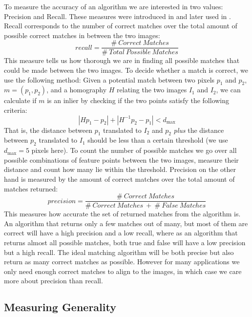 To measure the accuracy of an algorithm we are interested in two values:
Precision and Recall. These measures were introduced in \cite{ke2004pca}
and later used in \cite{mikolajczyk2005performance}. Recall corresponds 
to the number of correct matches over the total amount of possible 
correct matches in between the two images:
\begin{equation*}
	recall = \frac{\# ~ Correct ~ Matches}{\# ~ Total ~ Possible ~ 
	Matches}
\end{equation*}
This measure tells us how thorough we are in finding all possible 
matches that could be made between the two images. To decide whether a 
match is correct, we use the following method:
Given a potential match between two pixels $p_1$ and $p_2$, $m = 
\left(p_1, p_2\right)$, and a homography $H$ relating the two images 
$I_1$ and $I_2$, we can calculate if $m$ is an inlier by checking if the 
two points satisfy the following criteria:
\begin{equation*}
\left\vert H p_1 - p_2 \right\vert + \left\vert H^{-1}p_2 - p_1 \right\vert < d_{\max}
\end{equation*}
That is, the distance between $p_1$ translated to $I_2$ and $p_2$ 
\emph{plus} the distance between $p_2$ translated to $I_1$ should be 
less than a certain threshold (we use $d_{\max}=5$ pixels here). To 
count the number of possible matches we go over all possible 
combinations of feature points between the two images, measure their 
distance and count how many lie within the threshold.
Precision on the other hand is measured by the amount of correct matches
over the total amount of matches returned:
\begin{equation*}
	precision = \frac{\# ~ Correct ~ Matches}{\# ~ Correct ~ Matches ~ + 
	~ \# ~ False ~ Matches}
\end{equation*}
This measures how accurate the set of returned matches from the 
algorithm is. An algorithm that returns only a few matches out of many, 
but most of them are correct will have a high precision and a low 
recall, where as an algorithm that returns almost all possible matches, 
both true and false will have a low precision but a high recall. The 
ideal matching algorithm will be both precise but also return as many 
correct matches as possible. However for many applications we only need 
enough correct matches to align to the images, in which case we care 
more about precision than recall. 

\subsection{Measuring Generality}

